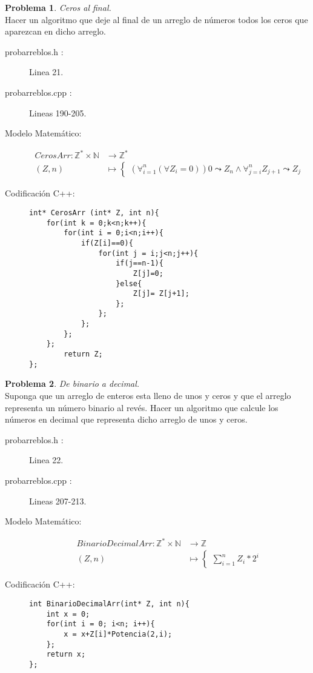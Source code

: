 \documentclass{article}
\theoremstyle{plain}
\theoremstyle{definition}
\newtheorem{problem}{Problema}
\begin{document}
\begin{problem} \emph{Ceros al final.}\\
\hspace*{7mm}Hacer un algoritmo que deje al final de un arreglo de números todos los ceros que aparezcan en dicho arreglo.
\begin{description}
\item[probarreblos.h :] Linea 21. \item[probarreblos.cpp :] Lineas 190-205.

\item[Modelo Matemático:]
\begin{align*}
CerosArr: \mathbb{Z}^{*}\times\mathbb{N} &\to \mathbb{Z}^{*}\\
(Z,n) &\mapsto
\begin{cases}
\left(\forall_{i=1}^n\left(\forall Z_i = 0\right)\right)  0 \leadsto Z_n  \wedge \forall_{j=i}^n   Z_{j+1} \leadsto Z_j
\end{cases}
\end{align*}
%
\item[Codificación \textsf{C++}:]\hfill
%
\begin{verbatim}
int* CerosArr (int* Z, int n){
    for(int k = 0;k<n;k++){
        for(int i = 0;i<n;i++){
            if(Z[i]==0){
                for(int j = i;j<n;j++){
                    if(j==n-1){
                        Z[j]=0;
                    }else{
                        Z[j]= Z[j+1];
                    };
                };
            };
        };
    };
        return Z;
};
\end{verbatim}
\end{description}
\end{problem}
%

\begin{problem} \emph{De binario a decimal.}\\
\hspace*{7mm}Suponga que un arreglo de enteros esta lleno de unos y ceros y que el arreglo representa un número binario al revés. Hacer un algoritmo que calcule los números en decimal que representa dicho arreglo de unos y ceros.
\begin{description}
\item[probarreblos.h :] Linea 22. \item[probarreblos.cpp :] Lineas 207-213.

\item[Modelo Matemático:]
\begin{align*}
BinarioDecimalArr: \mathbb{Z}^{*}\times\mathbb{N} &\to \mathbb{Z}\\
(Z,n) &\mapsto
\begin{cases}
\sum_{i=1}^{n} Z_{i}*2^{i}
\end{cases}
\end{align*}
%
\item[Codificación \textsf{C++}:]\hfill
%
\begin{verbatim}
int BinarioDecimalArr(int* Z, int n){
    int x = 0;
    for(int i = 0; i<n; i++){
        x = x+Z[i]*Potencia(2,i);
    };
    return x;
};
\end{verbatim}
\end{description}
\end{problem}
\end{document}
